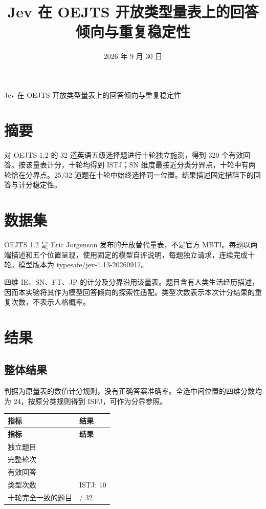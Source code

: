 \documentclass[10pt,a4paper,fontset=fandol]{ctexart}
\title{\sffamily Jev 在 OEJTS 开放类型量表上的回答倾向与重复稳定性}
\author{}
\date{2026 年 9 月 30 日}
\begin{document}
\begin{center}{\sffamily\LARGE Jev 在 OEJTS 开放类型量表上的回答倾向与重复稳定性\par}\vspace{8pt}{\small 2026 年 9 月 30 日}\end{center}\vspace{6pt}
\section*{摘要}
对 OEJTS 1.2 的 32 道英语五级选择题进行十轮独立施测，得到 320 个有效回答。按该量表计分，十轮均得到 ISTJ；SN 维度最接近分类分界点，十轮中有两轮恰在分界点。25/32 道题在十轮中始终选择同一位置。结果描述固定措辞下的回答与计分稳定性。
\section{数据集}
OEJTS 1.2 是 Eric Jorgenson 发布的开放替代量表，不是官方 MBTI。每题以两端描述和五个位置呈现，使用固定的模型自评说明，每题独立请求，连续完成十轮。模型版本为 typesafe/jev-1.13-20260917。

四维 IE、SN、FT、JP 的计分及分界沿用该量表。题目含有人类生活经历描述，因而本实验将其作为模型回答倾向的探索性适配。类型次数表示本次计分结果的重复次数，不表示人格概率。

\section{结果}
\subsection{整体结果}
判据为原量表的数值计分规则，没有正确答案准确率。全选中间位置的四维分数均为 24，按原分类规则得到 ISFJ，可作为分界参照。

{\small
\begin{longtable}{@{}>{\raggedright\arraybackslash}p{}>{\raggedright\arraybackslash}p{}@{}}
\toprule
\textbf{指标} & \textbf{结果}\\
\midrule
\endfirsthead
\toprule
\textbf{指标} & \textbf{结果}\\
\midrule
\endhead
独立题目 & 32\\
完整轮次 & 10\\
有效回答 & 320\\
类型次数 & ISTJ: 10\\
十轮完全一致的题目 & 25 / 32\\
\bottomrule
\end{longtable}
}
\end{document}
